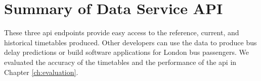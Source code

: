 \section{Summary of Data Service API}
\par These three \acrshort{api} endpoints provide easy access to the reference, current, and historical timetables produced. Other developers can use the data to produce bus delay predictions or build software applications for London bus passengers. We evaluated the accuracy of the timetables and the performance of the \acrshort{api} in Chapter \ref{ch:evaluation}.
